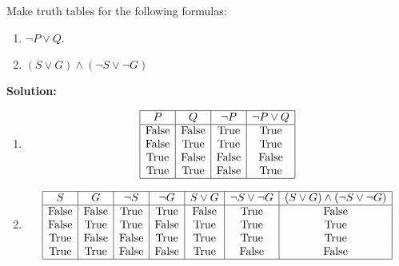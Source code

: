 Make truth tables for the following formulas:
\begin{enumerate}[label=(\alph*)]
    \item $\neg P \vee Q$.
    \item $(S \vee G) \wedge (\neg S \vee \neg G)$
\end{enumerate}

\textbf{Solution:}
\begin{enumerate}[label=(\alph*)]
\item 
    \[
    \begin{array}{|c|c|c|c|}
    \hline
    P & Q & \neg P & \neg P \vee Q \\
    \hline
    \text{False} & \text{False} & \text{True} & \text{True} \\
    \text{False} & \text{True} & \text{True} & \text{True} \\
    \text{True} & \text{False} & \text{False} & \text{False} \\
    \text{True} & \text{True} & \text{False} & \text{True} \\
    \hline
    \end{array}
    \]

\item
\[
\begin{array}{|c|c|c|c|c|c|c|}
\hline
S & G & \neg S & \neg G & S \vee G & \neg S \vee \neg G & (S \vee G) \wedge (\neg S \vee \neg G) \\
\hline
\text{False} & \text{False} & \text{True} & \text{True} & \text{False} & \text{True} & \text{False} \\
\text{False} & \text{True} & \text{True} & \text{False} & \text{True} & \text{True} & \text{True} \\
\text{True} & \text{False} & \text{False} & \text{True} & \text{True} & \text{True} & \text{True} \\
\text{True} & \text{True} & \text{False} & \text{False} & \text{True} & \text{False} & \text{False} \\
\hline
\end{array}
\]
\end{enumerate}

\pagebreak